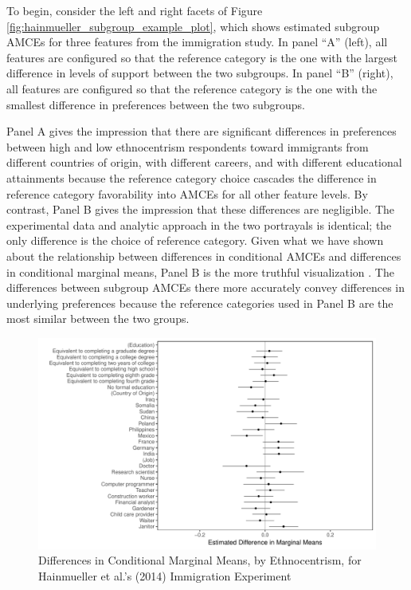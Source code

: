 \documentclass[a4paper,12pt]{article}\usepackage[]{graphicx}\usepackage[]{color}
\makeatletter
\def\maxwidth{ %
  \ifdim\Gin@nat@width>\linewidth
    \linewidth
  \else
    \Gin@nat@width
  \fi
}
\newenvironment{knitrout}{}{} %
\makeatother
\begin{document}
To begin, consider the left and right facets of Figure \ref{fig:hainmueller_subgroup_example_plot}, which shows estimated subgroup AMCEs for three features from the immigration study. In panel ``A'' (left), all features are configured so that the reference category is the one with the largest difference in levels of support between the two subgroups. In panel ``B'' (right), all features are configured so that the reference category is the one with the smallest difference in preferences between the two subgroups.

Panel A gives the impression that there are significant differences in preferences between high and low ethnocentrism respondents toward immigrants from different countries of origin, with different careers, and with different educational attainments because the reference category choice cascades the difference in reference category favorability into AMCEs for all other feature levels. By contrast, Panel B gives the impression that these differences are negligible. The experimental data and analytic approach in the two portrayals is identical; the only difference is the choice of reference category. Given what we have shown about the relationship between differences in conditional AMCEs and differences in conditional marginal means, Panel B is the more truthful visualization \citep{Cairo2016}. The differences between subgroup AMCEs there more accurately convey differences in underlying preferences because the reference categories used in Panel B are the most similar between the two groups.

\begin{knitrout}
\color{fgcolor}\begin{figure}
\includegraphics[width=\maxwidth]{figure/hainmueller_mm_diffs-1} \caption[Differences in Conditional Marginal Means, by Ethnocentrism, for Hainmueller et al.'s (2014) Immigration Experiment]{Differences in Conditional Marginal Means, by Ethnocentrism, for Hainmueller et al.'s (2014) Immigration Experiment}\label{fig:hainmueller_mm_diffs}
\end{figure}


\end{knitrout}
\end{document}
